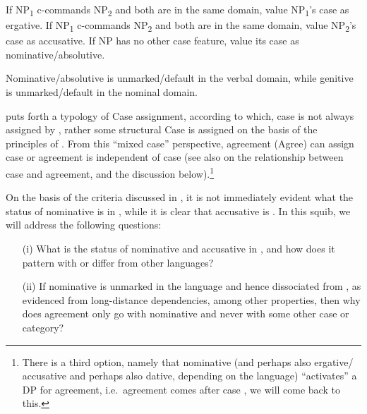 \documentclass[output=paper]{langsci/langscibook}
\begin{document}
\ea%
    \label{ex:13.3}
    \ea If NP\textsubscript{1} c-commands NP\textsubscript{2} and both are in
        the same domain, value NP\textsubscript{1}’s case as ergative.
    \ex If NP\textsubscript{1} c-commands NP\textsubscript{2} and both are in
        the same domain, value NP\textsubscript{2}’s case as accusative.
    \ex If NP has no other case feature, value its case as
        nominative/absolutive.
    \z
\z

Nominative/absolutive is unmarked/default in the verbal domain, while genitive
is unmarked/default in the nominal domain.

\citet{Baker2015} puts forth a typology of Case assignment, according to which,
case is not always assigned by , rather some structural Case is
assigned on the basis of the principles of . From this
\enquote{mixed case} perspective, agreement (Agree) can assign case or
agreement is independent of case (see also \citealt{Baker2008} on the
relationship between case and agreement, and the discussion
below).\footnote{There is a third option, namely that nominative (and perhaps also ergative/ accusative and perhaps also dative, depending
on the language) \enquote{activates} a DP for agreement, i.e.\  agreement comes
after case \citep{Bobaljik2008}, we will come back to this.}

On the basis of the criteria discussed in \textcite{Baker2008,Baker2015}, it is
not immediately evident what the status of nominative is in , while it is
clear that accusative is . In this squib, we will address the
following questions:

\begin{itemize}

    \item[(i)] What is the status of nominative and accusative in , and
        how does it pattern with or differ from other languages?

    \item[(ii)] If nominative is unmarked in the language
        and hence dissociated from , as evidenced from long-distance
        dependencies, among other properties, then why does agreement only go
        with nominative and never with some other case or
        category?

\end{itemize}
\end{document}

